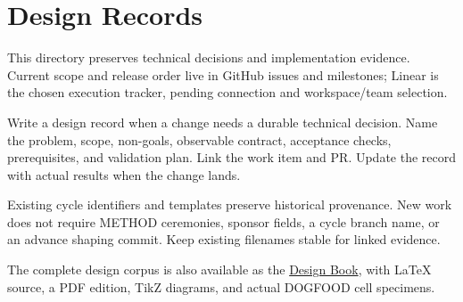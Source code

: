 \chapter{Design Records}\label{record-259}

\smallskip

This directory preserves technical decisions and implementation evidence. Current scope and release order live in GitHub issues and milestones; Linear is the chosen execution tracker, pending connection and workspace/team selection.

Write a design record when a change needs a durable technical decision. Name the problem, scope, non-goals, observable contract, acceptance checks, prerequisites, and validation plan. Link the work item and PR. Update the record with actual results when the change lands.

Existing cycle identifiers and templates preserve historical provenance. New work does not require METHOD ceremonies, sponsor fields, a cycle branch name, or an advance shaping commit. Keep existing filenames stable for linked evidence.

The complete design corpus is also available as the \href{https://github.com/flyingrobots/bijou/blob/cbd70612140e7a450d764b3c7be1c6af878b99bc/docs/book/README.md}{Design Book}, with LaTeX source, a PDF edition, TikZ diagrams, and actual DOGFOOD cell specimens.

